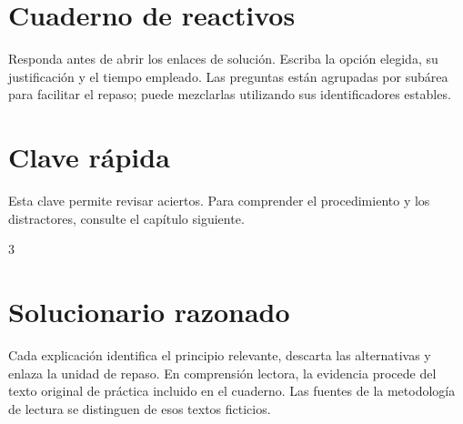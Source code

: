 \documentclass[11pt,letterpaper,oneside]{book}
\begin{document}
\chapter{Cuaderno de reactivos}
Responda antes de abrir los enlaces de solución. Escriba la opción elegida, su justificación y el tiempo empleado. Las preguntas están agrupadas por subárea para facilitar el repaso; puede mezclarlas utilizando sus identificadores estables.

\chapter{Clave rápida}
Esta clave permite revisar aciertos. Para comprender el procedimiento y los distractores, consulte el capítulo siguiente.\par
\begin{multicols}{3}

\end{multicols}
\chapter{Solucionario razonado}
Cada explicación identifica el principio relevante, descarta las alternativas y enlaza la unidad de repaso. En comprensión lectora, la evidencia procede del texto original de práctica incluido en el cuaderno. Las fuentes de la metodología de lectura se distinguen de esos textos ficticios.

\backmatter
\end{document}
